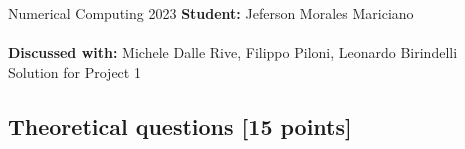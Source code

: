 \documentclass[unicode,11pt,a4paper,oneside,numbers=endperiod,openany]{scrartcl}
\begin{document}
\setassignment
{}

\serieheader
{Numerical Computing}
{2023}
{\textbf{Student:} Jeferson Morales Mariciano \\\\}
{\textbf{Discussed with:} Michele Dalle Rive, Filippo Piloni, Leonardo Birindelli}
{Solution for Project 1}{}
\newline

\assignmentpolicy

\newpage

\subsection{Theoretical questions [15 points]}
\end{document}

